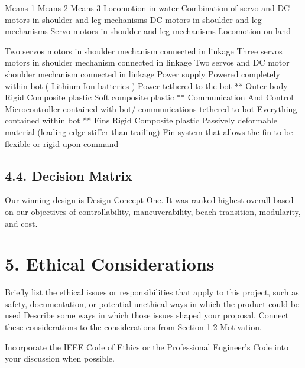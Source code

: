 \documentclass[10pt]{article}
\begin{document}
Means 1
Means 2
Means 3
Locomotion in water 
Combination of servo and DC motors in shoulder and leg mechanisms 
DC motors in shoulder and leg mechanisms
Servo motors in shoulder and leg mechanisms
Locomotion on land 

Two servos motors in shoulder mechanism connected in linkage 
Three servos motors in shoulder mechanism connected in linkage 
Two servos and DC motor shoulder mechanism connected in linkage 
Power supply 
Powered completely within bot ( Lithium Ion batteries )
Power tethered to the bot 
**
Outer body 
Rigid Composite plastic 
Soft composite plastic
**
Communication
 And Control
Microcontroller contained with bot/ communications tethered to bot
Everything contained within bot 
**
Fins 
Rigid Composite plastic
Passively deformable material (leading edge stiffer than trailing) 
Fin system that allows the fin to be flexible or rigid upon command 

\subsection{4.4. Decision Matrix}
%
Our winning design is Design Concept One. It was ranked highest overall based on our objectives of controllability, maneuverability, beach transition, modularity, and cost. 

\section{5. Ethical Considerations}
Briefly list the ethical issues or responsibilities that apply to this project, such as safety, documentation, or potential unethical ways in which the product could be used
Describe some ways in which those issues shaped your proposal.
Connect these considerations to the considerations from Section 1.2 Motivation.

  Incorporate the IEEE Code of Ethics or the Professional Engineer’s Code into your discussion when possible. 
\end{document}
